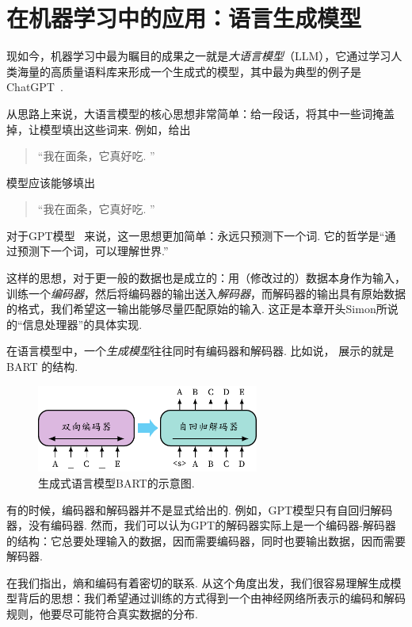 \section{在机器学习中的应用：语言生成模型}\label{sec:language-models}
现如今，机器学习中最为瞩目的成果之一就是\textit{大语言模型}（LLM），它通过学习人类海量的高质量语料库来形成一个生成式的模型，其中最为典型的例子是ChatGPT~\cite{ChatGPTOpenAI}.

从思路上来说，大语言模型的核心思想非常简单：给一段话，将其中一些词掩盖掉，让模型填出这些词来. 例如，给出
\begin{quotation}
    “我在\light{[mask]}面条，它真好吃. ”    
\end{quotation}
模型应该能够填出
\begin{quotation}
    “我在面条，它真好吃. ”
\end{quotation}

对于GPT模型~\cite{radfordImprovingLanguageUnderstanding} 来说，这一思想更加简单：永远只预测下一个词. 它的哲学是“通过预测下一个词，可以理解世界.”

这样的思想，对于更一般的数据也是成立的：用（修改过的）数据本身作为输入，训练一个\textit{编码器}，然后将编码器的输出送入\textit{解码器}，而解码器的输出具有原始数据的格式，我们希望这一输出能够尽量匹配原始的输入. 这正是本章开头Simon所说的“信息处理器”的具体实现. 

在语言模型中，一个\textit{生成模型}往往同时有编码器和解码器. 比如说， 展示的就是BART  \cite{lewisBARTDenoisingSequencetoSequence2019} 的结构.

\begin{figure}[ht]
    \centering
    \includegraphics[width=0.65\textwidth]{figures/information-theory/bart.pdf}
    \caption{生成式语言模型BART的示意图.}
    \label{fig:autoencoder}
\end{figure}

有的时候，编码器和解码器并不是显式给出的. 例如，GPT模型只有自回归解码器，没有编码器. 然而，我们可以认为GPT的解码器实际上是一个编码器-解码器的结构：它总要处理输入的数据，因而需要编码器，同时也要输出数据，因而需要解码器. 

在我们指出，熵和编码有着密切的联系. 从这个角度出发，我们很容易理解生成模型背后的思想：我们希望通过训练的方式得到一个由神经网络所表示的编码和解码规则，他要尽可能符合真实数据的分布.

